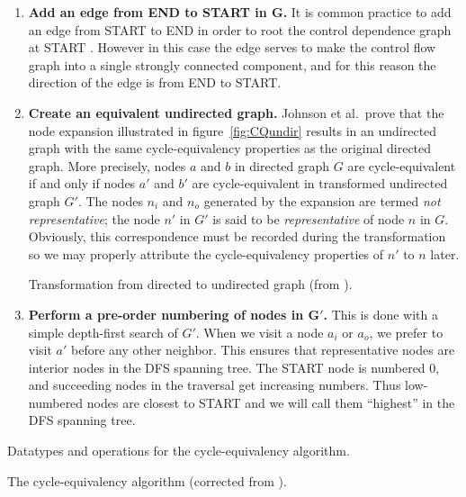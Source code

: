 \documentclass[12pt,titlepage,twoside]{article}
\newcommand*{\figscale}{1.0}
\begin{document}
\begin{enumerate}
\item \textbf{Add an edge from END to START in $\mathbf{G}$.} It is common
practice to add an edge from START to END in order to root the control
dependence graph at START \cite{cytron89:ssa}.  However in this case
the edge serves to make the control flow graph into a single strongly
connected component, and for this reason the direction of the edge is
from END to START.
\item \textbf{Create an equivalent undirected graph.}  Johnson et al.\
prove that the node expansion illustrated in figure~\vref{fig:CQundir}
results in an undirected graph with the same cycle-equivalency
properties as the original directed graph.  More precisely, nodes $a$
and $b$ in directed graph $G$ are cycle-equivalent if and only if
nodes $a'$ and $b'$ are cycle-equivalent in transformed undirected
graph $G'$.  The nodes $n_i$ and $n_o$ generated by the expansion are
termed \emph{not representative}; the node $n'$ in $G'$ is said to be
\emph{representative} of node $n$ in $G$.  Obviously, this
correspondence must be recorded during the transformation so we may
properly attribute the cycle-equivalency properties of $n'$ to $n$
later.
\begin{myfigure}
\begin{center}
\renewcommand*{\figscale}{0.5}
\end{center}
\caption{Transformation from directed to undirected graph
	 (from \cite{johnson93:sese}).}
\label{fig:CQundir}
\end{myfigure}
\item \textbf{Perform a pre-order numbering of nodes in $\mathbf{G'}$.}
This is done with a simple depth-first search of $G'$.  When we visit
a node $a_i$ or $a_o$, we prefer to visit $a'$ before any other
neighbor.  This ensures that representative nodes are interior nodes
in the DFS spanning tree. The START node is numbered 0, and succeeding
nodes in the traversal get increasing numbers.  Thus low-numbered
nodes are closest to START and we will call them ``highest'' in the
DFS spanning tree.
\end{enumerate}

\begin{myfigure}\small
\caption{Datatypes and operations for the cycle-equivalency algorithm.}
\label{fig:CQdata}\end{myfigure}

\begin{myalgorithm}\small\linespread{0.75}
\caption{The cycle-equivalency algorithm
	 (corrected from \cite{johnson93:sese}).}
\label{alg:CQalg}\end{myalgorithm}
\end{document}
